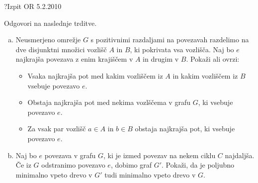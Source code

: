 \begin{naloga}{?}{Izpit OR 5.2.2010}
\begin{vprasanje}
Odgovori na naslednje trditve.
\begin{enumerate}[(a)]
\item Neusmerjeno omrežje $G$ s pozitivnimi razdaljami na povezavah
razdelimo na dve disjunktni množici vozlišč $A$ in $B$,
ki pokrivata vsa vozlišča.
Naj bo $e$ najkrajša povezava z enim krajiščem v $A$ in drugim v $B$.
Pokaži ali ovrzi:
    \begin{itemize}
    \item Vsaka najkrajša pot med kakim vozliščem iz $A$
    in kakim vozliščem iz $B$ vsebuje povezavo $e$.
    \item Obstaja najkrajša pot med nekima vozlščema v grafu $G$,
    ki vsebuje povezavo $e$.
    \item Za vsak par vozlišč $a \in A$ in $b \in B$ obstaja najkrajša pot,
    ki vsebuje povezavo $e$.
    \end{itemize}
\item Naj bo $e$ povezava v grafu $G$,
ki je izmed povezav na nekem ciklu $C$ najdaljša.
Če iz $G$ odstranimo povezavo $e$, dobimo graf $G'$.
Pokaži, da je poljubno minimalno vpeto drevo v $G'$
tudi minimalno vpeto drevo v $G$.
\end{enumerate}
\end{vprasanje}
\begin{odgovor}
\end{odgovor}
\end{naloga}

